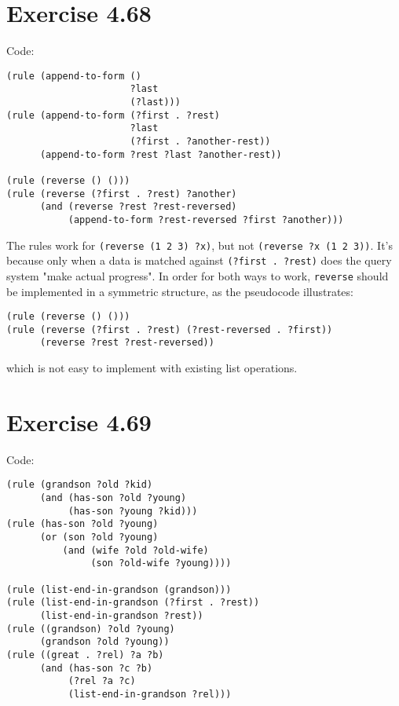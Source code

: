 \documentclass[../main.tex]{subfiles}
\begin{document}
\section{Exercise 4.68}

Code:

\begin{lstlisting}
(rule (append-to-form ()
                      ?last
                      (?last)))
(rule (append-to-form (?first . ?rest)
                      ?last
                      (?first . ?another-rest))
      (append-to-form ?rest ?last ?another-rest))

(rule (reverse () ()))
(rule (reverse (?first . ?rest) ?another)
      (and (reverse ?rest ?rest-reversed)
           (append-to-form ?rest-reversed ?first ?another)))
\end{lstlisting}

The rules work for \lstinline{(reverse (1 2 3) ?x)}, but not \lstinline{(reverse ?x (1 2 3))}. It's because only when a data is matched against \lstinline{(?first . ?rest)} does the query system "make actual progress". In order for both ways to work, \lstinline{reverse} should be implemented in a symmetric structure, as the pseudocode illustrates:

\begin{lstlisting}
(rule (reverse () ()))
(rule (reverse (?first . ?rest) (?rest-reversed . ?first))
      (reverse ?rest ?rest-reversed))
\end{lstlisting}

which is not easy to implement with existing list operations.

\section{Exercise 4.69}

Code:

\begin{lstlisting}
(rule (grandson ?old ?kid)
      (and (has-son ?old ?young)
           (has-son ?young ?kid)))
(rule (has-son ?old ?young)
      (or (son ?old ?young)
          (and (wife ?old ?old-wife)
               (son ?old-wife ?young))))

(rule (list-end-in-grandson (grandson)))
(rule (list-end-in-grandson (?first . ?rest))
      (list-end-in-grandson ?rest))
(rule ((grandson) ?old ?young)
      (grandson ?old ?young))
(rule ((great . ?rel) ?a ?b)
      (and (has-son ?c ?b)
           (?rel ?a ?c)
           (list-end-in-grandson ?rel)))
\end{lstlisting}
\end{document}
